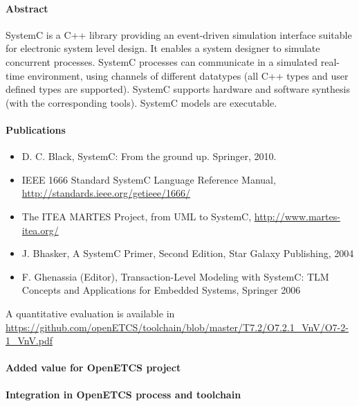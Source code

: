 \paragraph{Abstract} SystemC is a C++ library providing an event-driven simulation interface suitable for electronic system level design. It enables a system designer to simulate concurrent processes. SystemC processes can communicate in a simulated real-time environment, using channels of different datatypes (all C++ types and user defined types are supported). SystemC supports hardware and software synthesis (with the corresponding tools). SystemC models are executable.

\paragraph{Publications} 

\begin{itemize}
\item D. C. Black, SystemC: From the ground up. Springer, 2010.
\item IEEE 1666 Standard SystemC Language Reference Manual, \url{http://standards.ieee.org/getieee/1666/}
\item The ITEA MARTES Project, from UML to SystemC, \url{http://www.martes-itea.org/}
\item J. Bhasker, A SystemC Primer, Second Edition, Star Galaxy Publishing, 2004
\item F. Ghenassia (Editor), Transaction-Level Modeling with SystemC: TLM Concepts and
Applications for Embedded Systems, Springer 2006
\end{itemize}


A quantitative evaluation is available in \url{https://github.com/openETCS/toolchain/blob/master/T7.2/O7.2.1_VnV/O7-2-1_VnV.pdf}

\paragraph{Added value for OpenETCS project}

\begin{comment}
To complete: Stefan Rieger  ?
\end{comment}


\paragraph{Integration in OpenETCS process and toolchain}

\begin{comment}
To complete: Stefan Rieger  ?
\end{comment}


